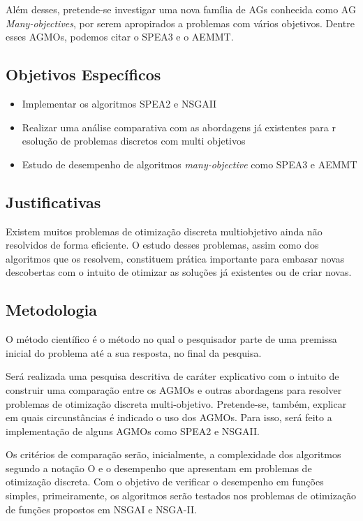 \documentclass[]{article}
\begin{document}
	Além desses, pretende-se investigar uma nova família de AGs conhecida como AG \textit{Many-objectives}, por serem apropirados a problemas com vários objetivos. Dentre esses AGMOs, podemos citar o SPEA3 e o AEMMT.
	
\subsection{Objetivos Específicos}

	\begin{itemize}
		\item Implementar os algoritmos SPEA2\cite{SPEA2} e NSGAII\cite{NSGAII}
		\item Realizar uma análise comparativa com as abordagens já existentes para r esolução de problemas discretos com multi objetivos
		\item Estudo de desempenho de algoritmos \textit{many-objective} como SPEA3 e AEMMT
	\end{itemize}

\subsection{Justificativas}
	
	Existem muitos problemas de otimização discreta multiobjetivo ainda não resolvidos de forma eficiente. O estudo desses problemas, assim como dos algoritmos que os resolvem, constituem prática importante para embasar novas descobertas com o intuito de otimizar as soluções já existentes ou de criar novas.

\subsection{Metodologia}
	
	O método científico é o método no qual o pesquisador parte de uma premissa inicial do problema até a sua resposta, no final da pesquisa.
	
	Será realizada uma pesquisa descritiva de caráter explicativo com o intuito de construir uma comparação entre os AGMOs e outras abordagens para resolver problemas de otimização discreta multi-objetivo. Pretende-se, também, explicar em quais circunstâncias é indicado o uso dos AGMOs. Para isso, será feito a implementação de alguns AGMOs como SPEA2\cite{SPEA2} e NSGAII\cite{NSGAII}.
	
	Os critérios de comparação serão, inicialmente, a complexidade dos algoritmos segundo a notação O e o desempenho que apresentam em problemas de otimização discreta. Com o objetivo de verificar o desempenho em funções simples, primeiramente, os algoritmos serão testados nos problemas de otimização de funções propostos em NSGAI\cite{NSGAI} e NSGA-II\cite{NSGAII}.
	
\end{document}
